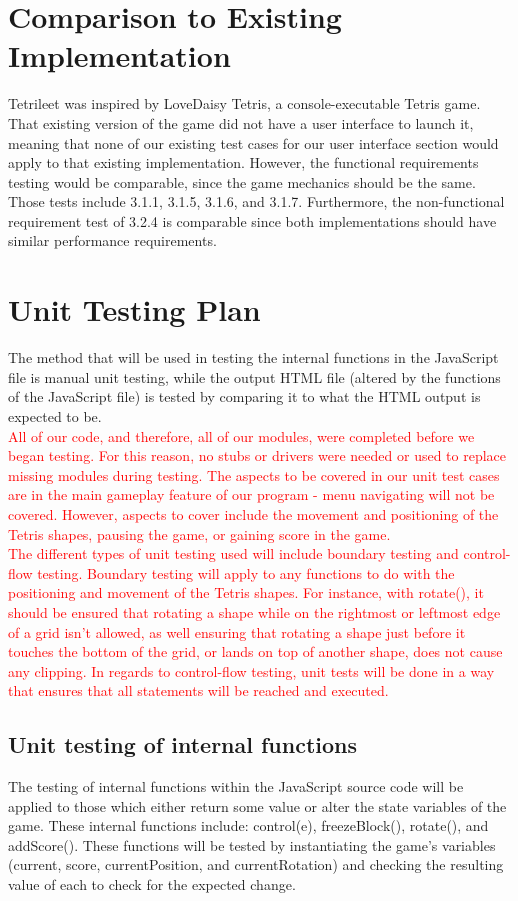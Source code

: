 \documentclass[12pt, titlepage]{article}
\begin{document}
\section{Comparison to Existing Implementation}	

Tetrileet was inspired by LoveDaisy Tetris, a console-executable Tetris game. That existing version of the game did not have a user interface to launch it, meaning that none of our existing test cases for our user interface section would apply to that existing implementation. However, the functional requirements testing would be comparable, since the game mechanics should be the same. Those tests include 3.1.1, 3.1.5, 3.1.6, and 3.1.7. Furthermore, the non-functional requirement test of 3.2.4 is comparable since both implementations should have similar performance requirements.   
				
\section{Unit Testing Plan}
		The method that will be used in testing the internal functions in the JavaScript file is manual unit testing, while the output HTML file (altered by the functions of the JavaScript file) is tested by comparing it to what the HTML output is expected to be.\\
\textcolor{red}{All of our code, and therefore, all of our modules, were completed before we began testing. For this reason, no stubs or drivers were needed or used to replace missing modules during testing. The aspects to be covered in our unit test cases are in the main gameplay feature of our program - menu navigating will not be covered. However, aspects to cover include the movement and positioning of the Tetris shapes, pausing the game, or gaining score in the game.\\
The different types of unit testing used will include boundary testing and control-flow testing. Boundary testing will apply to any functions to do with the positioning and movement of the Tetris shapes. For instance, with rotate(), it should be ensured that rotating a shape while on the rightmost or leftmost edge of a grid isn't allowed, as well ensuring that rotating a
shape just before it touches the bottom of the grid, or lands on top of another shape, does not cause any clipping. In regards to control-flow testing, unit tests will be done in a way that ensures that all statements will be reached and executed.}

\subsection{Unit testing of internal functions}
		The testing of internal functions within the JavaScript source code will be applied to those which either return some value or alter the state variables of the game. These internal functions include: control(e), freezeBlock(), rotate(), and addScore(). These functions will be tested by instantiating the game's variables (current, score, currentPosition, and currentRotation) and checking the resulting value of each to check for the expected change.
\end{document}
